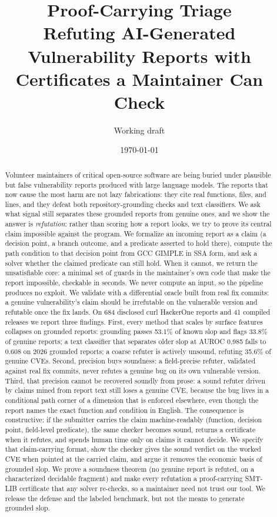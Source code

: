 \documentclass[11pt]{article}
\title{\textbf{Proof-Carrying Triage}\\[2pt]
\large Refuting AI-Generated Vulnerability Reports with\\ Certificates a Maintainer Can Check}
\author{Working draft}
\date{\today}
\begin{document}
\maketitle
\begin{abstract}
\noindent Volunteer maintainers of critical open-source software are being buried under plausible but false
vulnerability reports produced with large language models. The reports that now cause the most harm are not lazy
fabrications: they cite real functions, files, and lines, and they defeat both repository-grounding checks and text
classifiers. We ask what signal still separates these grounded reports from genuine ones, and we show the answer is
\emph{refutation}: rather than scoring how a report looks, we try to prove its central claim impossible against the
program. We formalize an incoming report as a claim (a decision point, a branch outcome, and a predicate asserted to
hold there), compute the path condition to that decision point from GCC GIMPLE in SSA form, and ask a solver whether
the claimed predicate can still hold. When it cannot, we return the unsatisfiable core: a minimal set of guards in
the maintainer's own code that make the report impossible, checkable in seconds. We never compute an input, so the
pipeline produces no exploit. We validate with a differential oracle built from real fix commits: a genuine
vulnerability's claim should be irrefutable on the vulnerable version and refutable once the fix lands. On 684
disclosed curl HackerOne reports and 41 compiled releases we report three findings. First, every method that scales
by surface features collapses on grounded reports: grounding passes 53.1\% of known slop and flags 33.8\% of genuine
reports; a text classifier that separates older slop at AUROC 0.985 falls to 0.608 on 2026 grounded reports; a
coarse refuter is actively unsound, refuting 35.6\% of genuine CVEs. Second, precision buys soundness: a
field-precise refuter, validated against real fix commits, never refutes a genuine bug on its own vulnerable version.
Third, that precision cannot be recovered soundly from prose: a sound refuter driven by claims mined from report text
still loses a genuine CVE, because the bug lives in a conditional path corner of a dimension that is enforced
elsewhere, even though the report names the exact function and condition in English. The consequence is constructive:
if the submitter carries the claim machine-readably (function, decision point, field-level predicate), the same
checker becomes sound, returns a certificate when it refutes, and spends human time only on claims it cannot decide.
We specify that claim-carrying format, show the checker gives the sound verdict on the worked CVE when pointed at the
carried claim, and argue it removes the economic basis of grounded slop. We prove a soundness theorem (no genuine
report is refuted, on a characterized decidable fragment) and make every refutation a proof-carrying SMT-LIB
certificate that any solver re-checks, so a maintainer need not trust our tool. We release the defense and the
labeled benchmark, but not the means to generate grounded slop.
\end{abstract}
\end{document}
